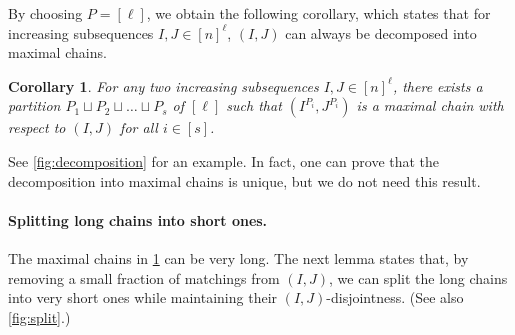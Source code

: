 \documentclass[11pt]{article}
\theoremstyle{plain}
\newtheorem{cor}[thm]{Corollary}
\theoremstyle{definition}
\theoremstyle{remark}
\begin{document}
By choosing $P=[\ell]$, we obtain the following corollary, which states that for increasing subsequences $I,J\in [n]^\ell$, $(I,J)$ can always be decomposed into maximal chains.

\begin{cor}\label{thm:structure}
For any two increasing subsequences $I,J\in[n]^{\ell}$, there exists a partition $P_1\sqcup P_2\sqcup \dots\sqcup P_s$ of $[\ell]$ such that $(I^{P_i},J^{P_i})$ is a maximal chain with respect to $(I,J)$ for all $i\in[s]$. 
\end{cor}

See \cref{fig:decomposition} for an example. In fact, one can prove that the decomposition into maximal chains is unique, but we do not need this result.









\paragraph{Splitting long chains into short ones.} 
The maximal chains in \cref{thm:structure} can be very long. The next lemma states that, by removing a small fraction of matchings from $(I,J)$, we can split the long chains into very short ones while maintaining their $(I,J)$-disjointness. (See also \cref{fig:split}.)
\end{document}
